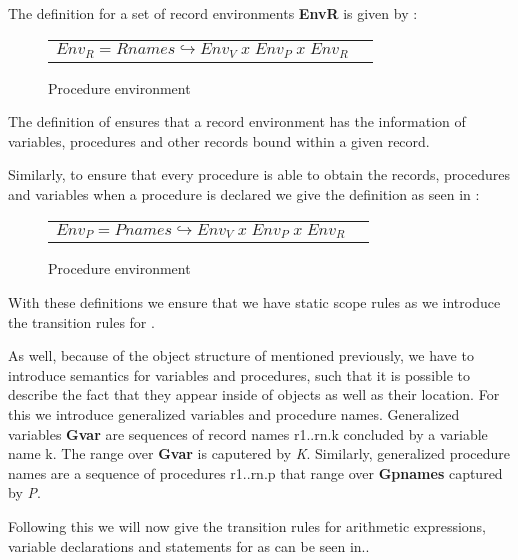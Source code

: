 The definition for a set of record environments \textbf{EnvR} is given by :

\begin{figure}[h]
	\centering
	\begin{tabular}{l l}
		$Env_R = Rnames \hookrightarrow Env_V \; x \; Env_P \; x \; Env_R$
	\end{tabular}
	\caption{Procedure environment}
	\label{fig:EnvRDef}
\end{figure}

The definition of  ensures that a record environment has the information of variables, procedures and other records bound within a given record.

Similarly, to ensure that every procedure is able to obtain the records, procedures and variables when a procedure is declared we give the definition as seen in :

\begin{figure}[h]
	\centering
	\begin{tabular}{l l}
		$Env_P = Pnames \hookrightarrow Env_V \; x \; Env_P \; x \; Env_R$
	\end{tabular}
	\caption{Procedure environment}
	\label{fig:EnvPDef}
\end{figure}

With these definitions we ensure that we have static scope rules as we introduce the transition rules for \dazel{}.

As well, because of the object structure of \dazel{} mentioned previously, we have to introduce semantics for variables and procedures, such that it is possible to describe the fact that they appear inside of objects as well as their location. For this we introduce generalized variables and procedure names.
Generalized variables \textbf{Gvar} are sequences of record names r1..rn.k concluded by a variable name k. The range over \textbf{Gvar} is caputered by \textit{K}.  
Similarly, generalized procedure names are a sequence of procedures r1..rn.p that range over \textbf{Gpnames} captured by \textit{P}.

Following this we will now give the transition rules for arithmetic expressions, variable declarations and statements for \dazel{} as can be seen in..

